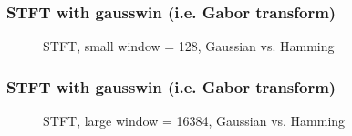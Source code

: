 \documentclass{beamer}
\begin{document}
\begin{frame}
	\frametitle{STFT with gausswin (i.e. Gabor transform)}
	\begin{figure}
		\centering
		\caption{STFT, small window = 128, Gaussian vs. Hamming}
	\end{figure}
\end{frame}

\begin{frame}
	\frametitle{STFT with gausswin (i.e. Gabor transform)}
	\begin{figure}
		\centering
		\caption{STFT, large window = 16384, Gaussian vs. Hamming}
	\end{figure}
\end{frame}
\end{document}
